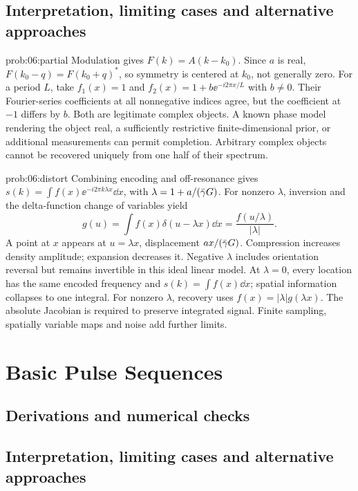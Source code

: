 \subsection{Interpretation, limiting cases and alternative approaches}
\begin{solution}{prob:06:partial}
Modulation gives \(F(k)=A(k-k_0)\). Since \(a\) is real,
\(F(k_0-q)=F(k_0+q)^*\), so symmetry is centered at \(k_0\), not generally zero.
For a period \(L\), take \(f_1(x)=1\) and
\(f_2(x)=1+b\ee^{-i2\pi x/L}\) with \(b\ne0\).
Their Fourier-series coefficients at all nonnegative indices agree, but the coefficient at \(-1\) differs by \(b\). Both are legitimate complex objects.
A known phase model rendering the object real, a sufficiently restrictive finite-dimensional prior, or additional measurements can permit completion. Arbitrary complex objects cannot be recovered uniquely from one half of their spectrum.
\end{solution}
\begin{solution}{prob:06:distort}
Combining encoding and off-resonance gives
\(s(k)=\int f(x)\ee^{-i2\pi k\lambda x}\dd x\), with
\(\lambda=1+a/(\bar{\gamma} G)\).
For nonzero \(\lambda\), inversion and the delta-function change of variables yield
\[
 g(u)=\int f(x)\delta(u-\lambda x)\dd x
     =\frac{f(u/\lambda)}{|\lambda|}.
\]
A point at \(x\) appears at \(u=\lambda x\), displacement
\(ax/(\bar{\gamma} G)\). Compression increases density amplitude; expansion decreases it.
Negative \(\lambda\) includes orientation reversal but remains invertible in this ideal linear model.
At \(\lambda=0\), every location has the same encoded frequency and
\(s(k)=\int f(x)\dd x\); spatial information collapses to one integral.
For nonzero \(\lambda\), recovery uses
\(f(x)=|\lambda|g(\lambda x)\).
The absolute Jacobian is required to preserve integrated signal. Finite sampling, spatially variable maps and noise add further limits.
\end{solution}

\section{Basic Pulse Sequences}
\label{sec:e:basic-pulse-sequences}
\subsection{Derivations and numerical checks}
\subsection{Interpretation, limiting cases and alternative approaches}
\par\pagebreak[1]

